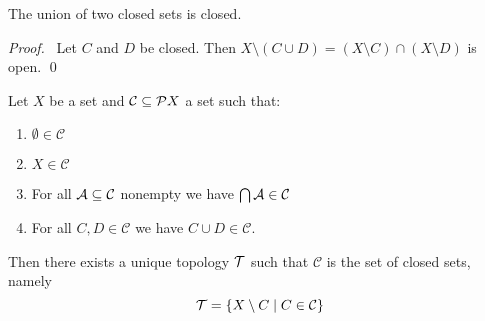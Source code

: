 \begin{lemma}
    \label{lemma:closed_union}
    The union of two closed sets is closed.
\end{lemma}

\begin{proof}
    \pf\ Let $C$ and $D$ be closed. Then $X \setminus (C \cup D) = (X \setminus C) \cap (X \setminus D)$
    is open. \qed
\end{proof}

\begin{proposition}
    Let $X$ be a set and $\mathcal{C} \subseteq \pow X$ a set such that:
    \begin{enumerate}
        \item $\emptyset \in \mathcal{C}$
        \item $X \in \mathcal{C}$
        \item For all $\AA \subseteq \mathcal{C}$ nonempty we have $\bigcap \AA \in \mathcal{C}$
        \item For all $C, D \in \mathcal{C}$ we have $C \cup D \in \mathcal{C}$.
    \end{enumerate}
    Then there exists a unique topology $\TT$ such that $\mathcal{C}$ is the set of closed sets, namely
    \[ \TT = \{ X \setminus C \mid C \in \mathcal{C} \} \]
\end{proposition}

